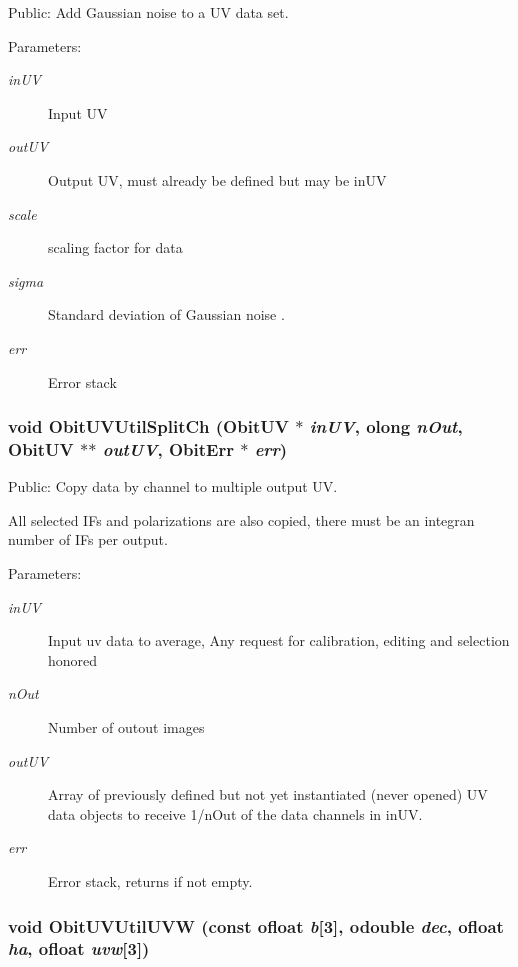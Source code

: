 Public: Add Gaussian noise to a UV data set. 

\begin{Desc}
\item[Parameters:]
\begin{description}
\item[{\em in\-UV}]Input UV \item[{\em out\-UV}]Output UV, must already be defined but may be in\-UV \item[{\em scale}]scaling factor for data \item[{\em sigma}]Standard deviation of Gaussian noise . \item[{\em err}]Error stack \end{description}
\end{Desc}
\subsubsection{\setlength{\rightskip}{0pt plus 5cm}void Obit\-UVUtil\-Split\-Ch ({\bf Obit\-UV} $\ast$ {\em in\-UV}, {\bf olong} {\em n\-Out}, {\bf Obit\-UV} $\ast$$\ast$ {\em out\-UV}, {\bf Obit\-Err} $\ast$ {\em err})}\label{ObitUVUtil_8c_a15}


Public: Copy data by channel to multiple output UV. 

All selected IFs and polarizations are also copied, there must be an integran number of IFs per output. \begin{Desc}
\item[Parameters:]
\begin{description}
\item[{\em in\-UV}]Input uv data to average, Any request for calibration, editing and selection honored \item[{\em n\-Out}]Number of outout images \item[{\em out\-UV}]Array of previously defined but not yet instantiated (never opened) UV data objects to receive 1/n\-Out of the data channels in in\-UV. \item[{\em err}]Error stack, returns if not empty. \end{description}
\end{Desc}
\subsubsection{\setlength{\rightskip}{0pt plus 5cm}void Obit\-UVUtil\-UVW (const {\bf ofloat} {\em b}[3], {\bf odouble} {\em dec}, {\bf ofloat} {\em ha}, {\bf ofloat} {\em uvw}[3])}\label{ObitUVUtil_8c_a18}



